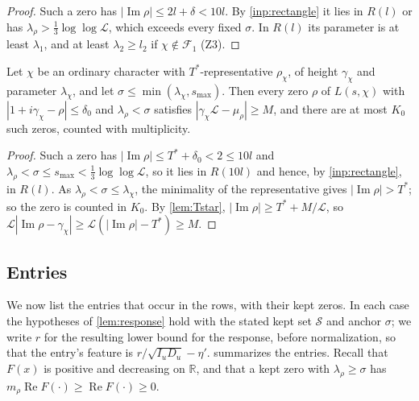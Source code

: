 \documentclass[11pt]{amsart}
\numberwithin{equation}{section}
\theoremstyle{plain}
\theoremstyle{definition}
\theoremstyle{remark}
\newcommand{\LL}{\mathcal{L}}
\newcommand{\RR}{\mathbb{R}}
\renewcommand{\Re}{\operatorname{Re}}
\renewcommand{\Im}{\operatorname{Im}}
\newcommand{\cS}{\mathcal{S}}
\newcommand{\1}{\mathbf{1}}
\begin{document}
\begin{proof}
Such a zero has $|\Im\rho|\le2l+\delta<10l$. By \cref{inp:rectangle} it lies in $R(l)$ or has
$\lambda_\rho>\frac13\log\log\LL$, which exceeds every fixed $\sigma$. In $R(l)$ its parameter is at least
$\lambda_1$, and at least $\lambda_2\ge l_2$ if $\chi\notin \mathcal F_1$ (Z3).
\end{proof}

\begin{lemma}\label{lem:strip}
Let $\chi$ be an ordinary character with $T^*$-representative $\rho_\chi$, of height $\gamma_\chi$ and
parameter $\lambda_\chi$, and let $\sigma\le\min(\lambda_\chi,s_{\max})$. Then every zero $\rho$ of $L(s,\chi)$ with
$|1+i\gamma_\chi-\rho|\le\delta_0$ and $\lambda_\rho<\sigma$ satisfies $|\gamma_\chi\LL-\mu_\rho|\ge M$, and there are at
most $K_0$ such zeros, counted with multiplicity.
\end{lemma}

\begin{proof}
Such a zero has $|\Im\rho|\le T^*+\delta_0<2\le10l$ and $\lambda_\rho<\sigma\le s_{\max}<\frac13\log\log\LL$, so it
lies in $R(10l)$ and hence, by \cref{inp:rectangle}, in $R(l)$. As $\lambda_\rho<\sigma\le\lambda_\chi$, the minimality
of the representative gives $|\Im\rho|>T^*$; so the zero is counted in $K_0$. By \cref{lem:Tstar},
$|\Im\rho|\ge T^*+M/\LL$, so $\LL|\Im\rho-\gamma_\chi|\ge\LL(|\Im\rho|-T^*)\ge M$.
\end{proof}

\subsection{Entries}\label{subsec:entries}
We now list the entries that occur in the rows, with their kept zeros. In each case the
hypotheses of \cref{lem:response} hold with the stated kept set $\cS$ and anchor $\sigma$; we write
$r$ for the resulting lower bound for the response, before normalization, so that the entry's
feature is $r/\sqrt{I_uD_u}-\eta'$.  summarizes the entries. Recall that $F(x)$ is
positive and decreasing on $\RR$, and that a kept zero with $\lambda_\rho\ge\sigma$ has
$m_\rho\Re F(\cdot)\ge\Re F(\cdot)\ge0$.
\end{document}
